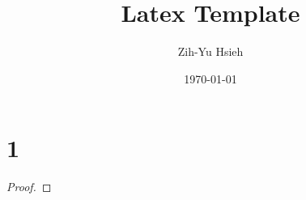 \documentclass{article}
\title{Latex Template}
\author{Zih-Yu Hsieh}
\date{\today}
\begin{document}
\maketitle

\section*{1}
\begin{ques}\label{q1}
\end{ques}

\begin{proof}
\end{proof}

\newpage
\end{document}
